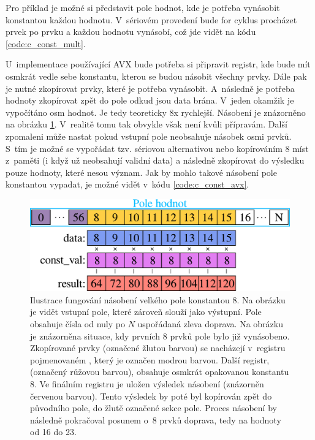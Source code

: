Pro příklad je možné si představit pole hodnot, kde je potřeba vynásobit konstantou každou hodnotu. V~sériovém provedení bude for cyklus procházet prvek po prvku a každou hodnotu vynásobí, což jde vidět na kódu \ref{code:c_const_mult}.

U~implementace používající AVX bude potřeba si připravit registr, kde bude mít osmkrát vedle sebe konstantu, kterou se budou násobit všechny prvky. Dále pak je nutné zkopírovat prvky, které je potřeba vynásobit. A~následně je potřeba hodnoty zkopírovat zpět do pole odkud jsou data brána. V~jeden okamžik je vypočítáno osm hodnot. Je tedy teoreticky 8x rychlejší. Násobení je znázorněno na obrázku \ref{fig:AVX_ilustration}. V~realitě tomu tak obvykle však není kvůli přípravám. Další zpomaleni může nastat pokud vstupní pole neobsahuje násobek osmi prvků. S~tím je možné se vypořádat tzv.  sériovou alternativou nebo kopírováním 8 míst z~paměti (i když už neobsahují validní data) a následně zkopírovat do výsledku pouze hodnoty, které nesou význam. Jak by mohlo takové násobení pole konstantou vypadat, je možné vidět v~kódu \ref{code:c_const_avx}.

\begin{figure}
    \centering
    \includegraphics[scale=0.8]{obrazky-figures/avx/AVX_ilustration.pdf}
    \caption{Ilustrace fungování násobení velkého pole konstantou $8$. Na obrázku je vidět vstupní pole, které zároveň slouží jako výstupní. Pole obsahuje čísla od nuly po $N$ uspořádaná zleva doprava. Na obrázku je znázorněna situace, kdy prvních 8 prvků pole bylo již vynásobeno. Zkopírované prvky (označené žlutou barvou) se nacházejí v~registru pojmenovaném , který je označen modrou barvou. Další registr,  (označený růžovou barvou), obsahuje osmkrát opakovanou konstantu $8$. Ve finálním registru  je uložen výsledek násobení (znázorněn červenou barvou). Tento výsledek by poté byl kopírován zpět do původního pole, do žlutě označené sekce pole. Proces násobení by následně pokračoval posunem o~8 prvků doprava, tedy na hodnoty od 16 do 23. }
    \label{fig:AVX_ilustration}
\end{figure}



